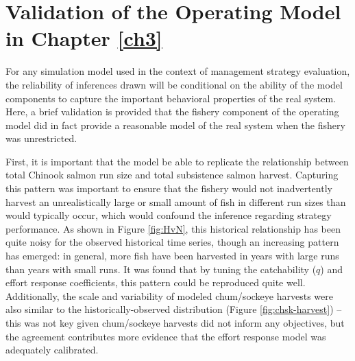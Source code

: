 \documentclass[12pt,]{book}
\theoremstyle{definition}
\theoremstyle{definition}
\theoremstyle{definition}
\theoremstyle{remark}
\begin{document}
\clearpage

\doublespacing

\chapter{Validation of the Operating Model in Chapter
\ref{ch3}}\label{appendix-b}

\noindent
For any simulation model used in the context of management strategy
evaluation, the reliability of inferences drawn will be conditional on
the ability of the model components to capture the important behavioral
properties of the real system. Here, a brief validation is provided that
the fishery component of the operating model did in fact provide a
reasonable model of the real system when the fishery was unrestricted.

First, it is important that the model be able to replicate the
relationship between total Chinook salmon run size and total subsistence
salmon harvest. Capturing this pattern was important to ensure that the
fishery would not inadvertently harvest an unrealistically large or
small amount of fish in different run sizes than would typically occur,
which would confound the inference regarding strategy performance. As
shown in Figure \ref{fig:HvN}, this historical relationship has been
quite noisy for the observed historical time series, though an
increasing pattern has emerged: in general, more fish have been
harvested in years with large runs than years with small runs. It was
found that by tuning the catchability (\(q\)) and effort response
coefficients, this pattern could be reproduced quite well. Additionally,
the scale and variability of modeled chum/sockeye harvests were also
similar to the historically-observed distribution (Figure
\ref{fig:chsk-harvest}) -- this was not key given chum/sockeye harvests
did not inform any objectives, but the agreement contributes more
evidence that the effort response model was adequately calibrated.
\end{document}
